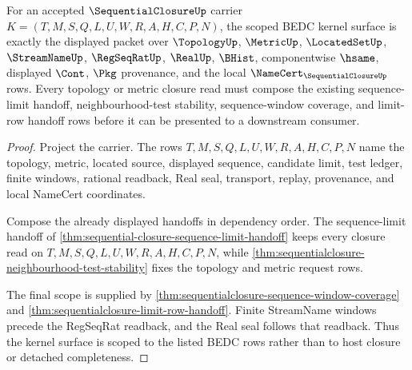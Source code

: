 \begin{theorem}
\label{thm:sequentialclosure-kernel-scope-surface}
For an accepted $\SequentialClosureUp$ carrier $K=(T,M,S,Q,L,U,W,R,A,H,C,P,N)$, the scoped BEDC kernel surface is exactly the displayed packet over $\TopologyUp$, $\MetricUp$, $\LocatedSetUp$, $\StreamNameUp$, $\RegSeqRatUp$, $\RealUp$, $\BHist$, componentwise $\hsame$, displayed $\Cont$, $\Pkg$ provenance, and the local $\NameCert_{\SequentialClosureUp}$ rows. Every topology or metric closure read must compose the existing sequence-limit handoff, neighbourhood-test stability, sequence-window coverage, and limit-row handoff rows before it can be presented to a downstream consumer.
\end{theorem}
\begin{proof}
Project the carrier. The rows $T,M,S,Q,L,U,W,R,A,H,C,P,N$ name the topology, metric, located source, displayed sequence, candidate limit, test ledger, finite windows, rational readback, Real seal, transport, replay, provenance, and local NameCert coordinates.

Compose the already displayed handoffs in dependency order. The sequence-limit handoff of \autoref{thm:sequential-closure-sequence-limit-handoff} keeps every closure read on $T,M,S,Q,L,U,W,R,A,H,C,P,N$, while \autoref{thm:sequentialclosure-neighbourhood-test-stability} fixes the topology and metric request rows.

The final scope is supplied by \autoref{thm:sequentialclosure-sequence-window-coverage} and \autoref{thm:sequentialclosure-limit-row-handoff}. Finite StreamName windows precede the RegSeqRat readback, and the Real seal follows that readback. Thus the kernel surface is scoped to the listed BEDC rows rather than to host closure or detached completeness.
\end{proof}

